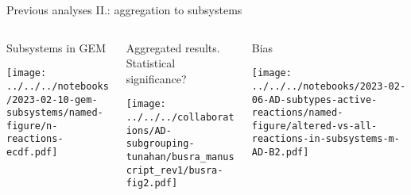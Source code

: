 \documentclass[aspectratio=169]{beamer}
\begin{document}
\begin{frame}{Previous analyses II.: aggregation to subsystems}
\begin{columns}[t]
\begin{column}{0.3\textwidth}
\begin{center}
  Subsystems in GEM
\end{center}

\texttt{[image: ../../../notebooks/2023-02-10-gem-subsystems/named-figure/n-reactions-ecdf.pdf]}
\end{column}

\begin{column}{0.4\textwidth}
\begin{center}
  Aggregated results.\\
  \scriptsize Statistical significance?
\end{center}

\texttt{[image: ../../../collaborations/AD-subgrouping-tunahan/busra\_manuscript\_rev1/busra-fig2.pdf]}
\end{column}
\begin{column}{0.3\textwidth}
\begin{center}
  Bias
\end{center}

\texttt{[image: ../../../notebooks/2023-02-06-AD-subtypes-active-reactions/named-figure/altered-vs-all-reactions-in-subsystems-m-AD-B2.pdf]}
\end{column}
\end{columns}
\end{frame}

\begin{frame}
\begin{columns}[t]
\begin{column}{0.5\textwidth}
\end{column}

\begin{column}{0.5\textwidth}

\end{column}
\end{columns}
\end{frame}
\end{document}
